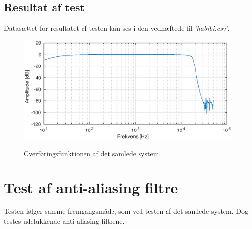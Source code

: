 \subsection{Resultat af test}
Datasættet for resultatet af testen kan ses i den vedhæftede fil \textit{'habibi.csv'}. 
\begin{figure}[h]
	\caption{Overføringsfunktionen af det samlede system.}
	\includegraphics[width=1\linewidth]{./billeder/tf_samletsystem.eps}
	\label{fig:tf_samletsystem}
\end{figure}

\section{Test af anti-aliasing filtre}
Testen følger samme fremgangsmåde, som ved testen af det samlede system. 
Dog testes udelukkende anti-aliasing filtrene. 